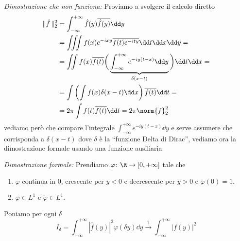\textit{Dimostrazione che non funziona:}
Proviamo a svolgere il calcolo diretto
$$
\begin{aligned}
	\|\hat f\,\|_2^2 
	&= \int_{-\infty}^{+\infty} \hat f(y) \overline{\hat f(y)} \dd y \\
	&= \iiint f(x) e^{-ixy} \overline{f(t) e^{-ity}} \dd t \dd x \dd y = \\
	&= \iint f(x) \overline{f(t)} \bigg( \underbrace{\int_{-\infty}^{+\infty} e^{-iy(t-x)} \dd y}_{\delta(x-t)} \bigg) \dd t \dd x = \\
	&= \int \left( \int f(x) \delta(x - t) \dd x \right) \overline{f(t)} \dd t = \\
	&= 2\pi \int f(t) \overline{f(t)} \dd t = 2\pi \norm{f}_2^2
\end{aligned}
$$
vediamo però che compare l'integrale $\int_{-\infty}^{+\infty} e^{-iy(t-x)} \dd y$ e serve assumere che corrisponda a $\delta(x - t)$ dove $\delta$ è la ``funzione Delta di Dirac'', vediamo ora la dimostrazione formale usando una funzione ausiliaria.

\textit{Dimostrazione formale:}
Prendiamo $\varphi \colon \R \to [0,+\infty]$ tale che
\begin{enumerate}
	\item $\varphi$ continua in $0$, crescente per $y < 0$ e decrescente per $y > 0$ e $\varphi(0) = 1$.
	\item $\varphi \in L^1$ e $\check\varphi \in L^1$.
\end{enumerate}

Poniamo per ogni $\delta$
$$
I_\delta = \int_{-\infty}^{+\infty} |\hat f(y)|^2 \varphi(\delta y) \dd y
\xrightarrow{\text{?}}
\int_{-\infty}^{+\infty} |f(y)|^2
$$

